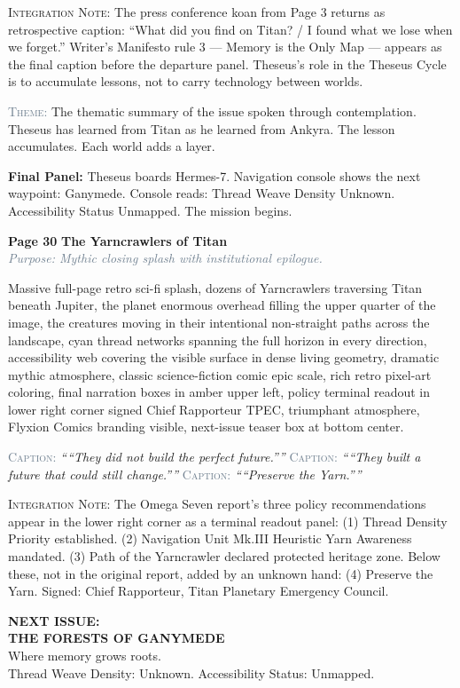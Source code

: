 \documentclass[11pt]{article}
\newcommand{\pagecaption}[1]{\medskip\noindent\textcolor{slateGray}{\textsc{Caption:}} \textit{``#1''}\medskip}
\newcommand{\cliffhanger}[1]{\medskip\noindent\textcolor{cyanThread}{\textbf{Final Panel:}} #1\medskip}
\newcommand{\prompt}[1]{\begin{terminal}{\small #1}\end{terminal}}
\newcommand{\theme}[1]{\medskip\noindent\textcolor{slateGray}{\textsc{Theme:}} #1\medskip}
\newcommand{\integration}[1]{\medskip\noindent\textcolor{archiveGold}{\textsc{Integration Note:}} #1\medskip}
\newcommand{\pageheading}[3]{%
  \begin{pagebox}
    \noindent\textbf{\textcolor{titanOrange}{Page #1}} \hfill \textbf{\textcolor{cyanThread}{#2}}\\[2pt]
    \noindent\textcolor{slateGray}{\textit{Purpose: #3}}
  \end{pagebox}
  \medskip
}
\begin{document}
\integration{The press conference koan from Page 3 returns as retrospective caption: ``What did you find on Titan? / I found what we lose when we forget.'' Writer's Manifesto rule 3 --- Memory is the Only Map --- appears as the final caption before the departure panel. Theseus's role in the Theseus Cycle is to accumulate lessons, not to carry technology between worlds.}

\theme{The thematic summary of the issue spoken through contemplation. Theseus has learned from Titan as he learned from Ankyra. The lesson accumulates. Each world adds a layer.}

\cliffhanger{Theseus boards Hermes-7. Navigation console shows the next waypoint: Ganymede. Console reads: Thread Weave Density Unknown. Accessibility Status Unmapped. The mission begins.}

\vspace{0.5em}

\pageheading{30}{The Yarncrawlers of Titan}{Mythic closing splash with institutional epilogue.}

\prompt{Massive full-page retro sci-fi splash, dozens of Yarncrawlers traversing Titan beneath Jupiter, the planet enormous overhead filling the upper quarter of the image, the creatures moving in their intentional non-straight paths across the landscape, cyan thread networks spanning the full horizon in every direction, accessibility web covering the visible surface in dense living geometry, dramatic mythic atmosphere, classic science-fiction comic epic scale, rich retro pixel-art coloring, final narration boxes in amber upper left, policy terminal readout in lower right corner signed Chief Rapporteur TPEC, triumphant atmosphere, Flyxion Comics branding visible, next-issue teaser box at bottom center.}

\pagecaption{``They did not build the perfect future.''}
\pagecaption{``They built a future that could still change.''}
\pagecaption{``Preserve the Yarn.''}

\integration{The Omega Seven report's three policy recommendations appear in the lower right corner as a terminal readout panel: (1) Thread Density Priority established. (2) Navigation Unit Mk.III Heuristic Yarn Awareness mandated. (3) Path of the Yarncrawler declared protected heritage zone. Below these, not in the original report, added by an unknown hand: (4) Preserve the Yarn. Signed: Chief Rapporteur, Titan Planetary Emergency Council.}

\begin{center}
\begin{mdframed}[linecolor=cyanThread, linewidth=2pt, innerleftmargin=20pt, innerrightmargin=20pt, innertopmargin=12pt, innerbottommargin=12pt, backgroundcolor=darkBg]
  {\large\bfseries\color{titanOrange} NEXT ISSUE:}\\[6pt]
  {\LARGE\bfseries\color{cyanThread} THE FORESTS OF GANYMEDE}\\[4pt]
  {\normalsize\color{archiveGold} Where memory grows roots.}\\[4pt]
  {\small\color{slateGray} Thread Weave Density: Unknown. Accessibility Status: Unmapped.}
\end{mdframed}
\end{center}
\end{document}
